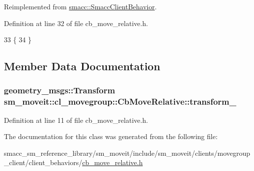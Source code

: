Reimplemented from \hyperlink{classsmacc_1_1SmaccClientBehavior_ac0cd72d42bd00425362a97c9803ecce5}{smacc\+::\+Smacc\+Client\+Behavior}.



Definition at line 32 of file cb\+\_\+move\+\_\+relative.\+h.


\begin{DoxyCode}
33     \{
34     \}
\end{DoxyCode}


\subsection{Member Data Documentation}
\subsubsection[{\texorpdfstring{transform\+\_\+}{transform_}}]{\setlength{\rightskip}{0pt plus 5cm}geometry\+\_\+msgs\+::\+Transform sm\+\_\+moveit\+::cl\+\_\+movegroup\+::\+Cb\+Move\+Relative\+::transform\+\_\+}\hypertarget{classsm__moveit_1_1cl__movegroup_1_1CbMoveRelative_ac0f70c737faaaeb5e63aa2a4f727d30e}{}\label{classsm__moveit_1_1cl__movegroup_1_1CbMoveRelative_ac0f70c737faaaeb5e63aa2a4f727d30e}


Definition at line 11 of file cb\+\_\+move\+\_\+relative.\+h.



The documentation for this class was generated from the following file\+:\begin{DoxyCompactItemize}
\item 
smacc\+\_\+sm\+\_\+reference\+\_\+library/sm\+\_\+moveit/include/sm\+\_\+moveit/clients/movegroup\+\_\+client/client\+\_\+behaviors/\hyperlink{cb__move__relative_8h}{cb\+\_\+move\+\_\+relative.\+h}\end{DoxyCompactItemize}

